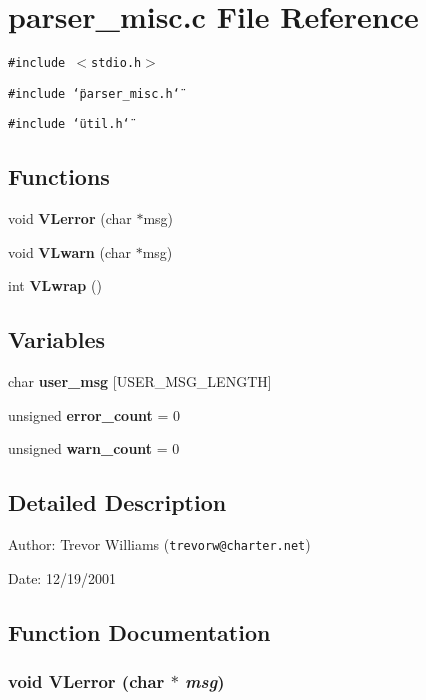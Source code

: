 \section{parser\_\-misc.c File Reference}
\label{parser__misc_8c}
{\tt \#include $<$stdio.h$>$}\par
{\tt \#include \char`\"{}parser\_\-misc.h\char`\"{}}\par
{\tt \#include \char`\"{}util.h\char`\"{}}\par
\subsection*{Functions}
\begin{CompactItemize}
\item 
void {\bf VLerror} (char $\ast$msg)
\item 
void {\bf VLwarn} (char $\ast$msg)
\item 
int {\bf VLwrap} ()
\end{CompactItemize}
\subsection*{Variables}
\begin{CompactItemize}
\item 
char {\bf user\_\-msg} [USER\_\-MSG\_\-LENGTH]
\item 
unsigned {\bf error\_\-count} = 0
\item 
unsigned {\bf warn\_\-count} = 0
\end{CompactItemize}


\subsection{Detailed Description}
\begin{Desc}
\item[Author:]Trevor Williams ({\tt trevorw@charter.net}) \end{Desc}
\begin{Desc}
\item[Date:]12/19/2001\end{Desc}


\subsection{Function Documentation}
\subsubsection{\setlength{\rightskip}{0pt plus 5cm}void VLerror (char $\ast$ {\em msg})}\label{parser__misc_8c_a3}


